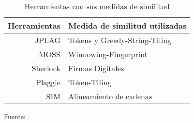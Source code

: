 \begin{table}[H]
\centering
\begin{tabular}{|r||l|}
\hline
Herramientas & Medida de similitud utilizadas \\ \hline\hline
JPLAG       & Tokens y Greedy-String-Tiling \\ \hline
MOSS        & Winnowing-Fingerprint \\ \hline
Sherlock    & Firmas Digitales  \\ \hline
Plaggie     & Token-Tiling  \\ \hline
SIM         & Alineamiento de cadenas  \\ \hline
\end{tabular}
\caption{Herramientas con sus medidas de similitud}
Fuente: \cite{Ragkhitwetsagul2018}.
\label{descripcionHerramientasMedida}
\end{table}